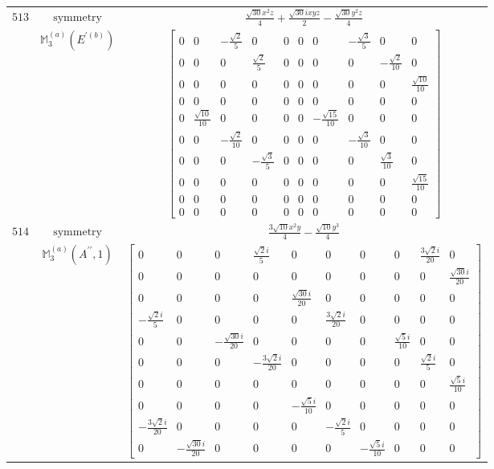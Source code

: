 \documentclass[fleqn,8pt,landscape]{jsarticle}
\begin{document}
\begin{longtable}{ccc}
$ 513 $ & $ \text{symmetry} $ & $ \frac{\sqrt{30} x^{2} z}{4} + \frac{\sqrt{30} i x y z}{2} - \frac{\sqrt{30} y^{2} z}{4} $ \\
$  $ & $ \mathbb{M}_{3}^{(a)}(E^{\prime(b)}) $ & $ \begin{bmatrix} 0 & 0 & - \frac{\sqrt{2}}{5} & 0 & 0 & 0 & 0 & - \frac{\sqrt{3}}{5} & 0 & 0 \\ 0 & 0 & 0 & \frac{\sqrt{2}}{5} & 0 & 0 & 0 & 0 & - \frac{\sqrt{2}}{10} & 0 \\ 0 & 0 & 0 & 0 & 0 & 0 & 0 & 0 & 0 & \frac{\sqrt{10}}{10} \\ 0 & 0 & 0 & 0 & 0 & 0 & 0 & 0 & 0 & 0 \\ 0 & \frac{\sqrt{10}}{10} & 0 & 0 & 0 & 0 & - \frac{\sqrt{15}}{10} & 0 & 0 & 0 \\ 0 & 0 & - \frac{\sqrt{2}}{10} & 0 & 0 & 0 & 0 & - \frac{\sqrt{3}}{10} & 0 & 0 \\ 0 & 0 & 0 & - \frac{\sqrt{3}}{5} & 0 & 0 & 0 & 0 & \frac{\sqrt{3}}{10} & 0 \\ 0 & 0 & 0 & 0 & 0 & 0 & 0 & 0 & 0 & \frac{\sqrt{15}}{10} \\ 0 & 0 & 0 & 0 & 0 & 0 & 0 & 0 & 0 & 0 \\ 0 & 0 & 0 & 0 & 0 & 0 & 0 & 0 & 0 & 0 \end{bmatrix} $ \\ \hline
$ 514 $ & $ \text{symmetry} $ & $ \frac{3 \sqrt{10} x^{2} y}{4} - \frac{\sqrt{10} y^{3}}{4} $ \\
$  $ & $ \mathbb{M}_{3}^{(a)}(A^{\prime\prime},1) $ & $ \begin{bmatrix} 0 & 0 & 0 & \frac{\sqrt{2} i}{5} & 0 & 0 & 0 & 0 & \frac{3 \sqrt{2} i}{20} & 0 \\ 0 & 0 & 0 & 0 & 0 & 0 & 0 & 0 & 0 & \frac{\sqrt{30} i}{20} \\ 0 & 0 & 0 & 0 & \frac{\sqrt{30} i}{20} & 0 & 0 & 0 & 0 & 0 \\ - \frac{\sqrt{2} i}{5} & 0 & 0 & 0 & 0 & \frac{3 \sqrt{2} i}{20} & 0 & 0 & 0 & 0 \\ 0 & 0 & - \frac{\sqrt{30} i}{20} & 0 & 0 & 0 & 0 & \frac{\sqrt{5} i}{10} & 0 & 0 \\ 0 & 0 & 0 & - \frac{3 \sqrt{2} i}{20} & 0 & 0 & 0 & 0 & \frac{\sqrt{2} i}{5} & 0 \\ 0 & 0 & 0 & 0 & 0 & 0 & 0 & 0 & 0 & \frac{\sqrt{5} i}{10} \\ 0 & 0 & 0 & 0 & - \frac{\sqrt{5} i}{10} & 0 & 0 & 0 & 0 & 0 \\ - \frac{3 \sqrt{2} i}{20} & 0 & 0 & 0 & 0 & - \frac{\sqrt{2} i}{5} & 0 & 0 & 0 & 0 \\ 0 & - \frac{\sqrt{30} i}{20} & 0 & 0 & 0 & 0 & - \frac{\sqrt{5} i}{10} & 0 & 0 & 0 \end{bmatrix} $ \\ \hline

\end{longtable}
\end{document}
